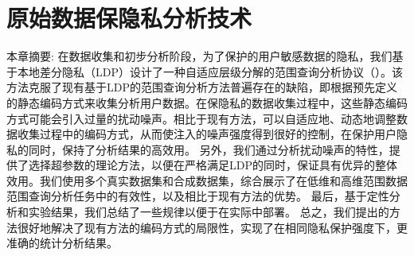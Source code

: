 



\chapter{原始数据保隐私分析技术}
本章摘要: 
在数据收集和初步分析阶段，为了保护的用户敏感数据的隐私，我们基于本地差分隐私（LDP）设计了一种自适应层级分解的范围查询分析协议（\myahead ）。该方法克服了现有基于LDP的范围查询分析方法普遍存在的缺陷，即根据预先定义的静态编码方式来收集分析用户数据。在保隐私的数据收集过程中，这些静态编码方式可能会引入过量的扰动噪声。相比于现有方法，\myahead 可以自适应地、动态地调整数据收集过程中的编码方式，从而使注入的噪声强度得到很好的控制，在保护用户隐私的同时，保持了分析结果的高效用。
另外，我们通过分析扰动噪声的特性，提供了选择\myahead 超参数的理论方法，以便在严格满足LDP的同时，保证\myahead 具有优异的整体效用。我们使用多个真实数据集和合成数据集，综合展示了\myahead 在低维和高维范围数据范围查询分析任务中的有效性，以及相比于现有方法的优势。
最后，基于定性分析和实验结果，我们总结了一些规律以便于在实际中部署\myahead 。
总之，我们提出的方法很好地解决了现有方法的编码方式的局限性，实现了在相同隐私保护强度下，更准确的统计分析结果。

